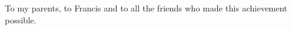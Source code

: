 
%

\begin{ntdedication}

To my parents, to Francis and to all the friends who made this achievement possible.

\end{ntdedication}